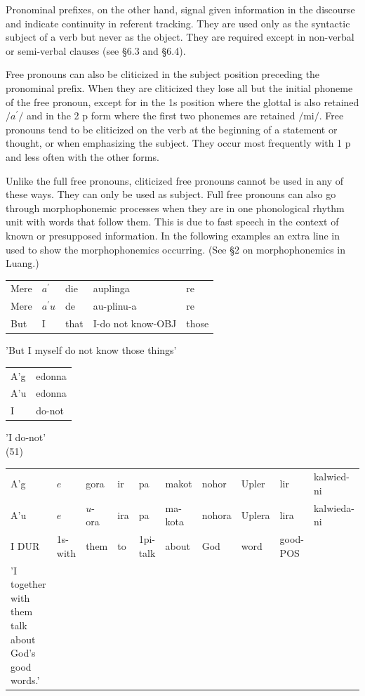 \documentclass[10pt]{article}
\begin{document}
Pronominal prefixes, on the other hand, signal given information in the discourse and indicate continuity in referent tracking. They are used only as the syntactic subject of a verb but never as the object. They are required except in non-verbal or semi-verbal clauses (see §6.3 and §6.4).

Free pronouns can also be cliticized in the subject position preceding the pronominal prefix. When they are cliticized they lose all but the initial phoneme of the free pronoun, except for in the 1s position where the glottal is also retained \(/ a^{\prime} /\) and in the 2 p form where the first two phonemes are retained \(/ \mathrm{mi} /\). Free pronouns tend to be cliticized on the verb at the beginning of a statement or thought, or when emphasizing the subject. They occur most frequently with 1 p and less often with the other forms.

Unlike the full free pronouns, cliticized free pronouns cannot be used in any of these ways. They can only be used as subject. Full free pronouns can also go through morphophonemic processes when they are in one phonological rhythm unit with words that follow them. This is due to fast speech in the context of known or presupposed information. In the following examples an extra line in used to show the morphophonemics occurring. (See §2 on morphophonemics in Luang.)

\begin{center}
\begin{tabular}{lllll}
Mere & \(a^{\prime}\) & die & auplinga & re \\
Mere & \(a^{\prime} u\) & de & au-plinu-a & re \\
But & I & that & I-do not know-OBJ & those \\
\end{tabular}
\end{center}

'But I myself do not know those things'

\begin{center}
\begin{tabular}{ll}
A'g & edonna \\
A'u & edonna \\
I & do-not \\
\end{tabular}
\end{center}

'I do-not'\\
(51)

\begin{center}
\begin{tabular}{llllllllll}
A'g & \(e\) & gora & ir & pa & makot & nohor & Upler & lir & kalwied-ni \\
A'u & \(e\) & \(u\)-ora & ira & pa & ma-kota & nohora & Uplera & lira & kalwieda-ni \\
I DUR & 1s-with & them & to & 1pi-talk & about & God & word & good-POS &  \\
'I together with them talk about God's good words.' &  &  &  &  &  &  &  &  &  \\
\end{tabular}
\end{center}
\end{document}
